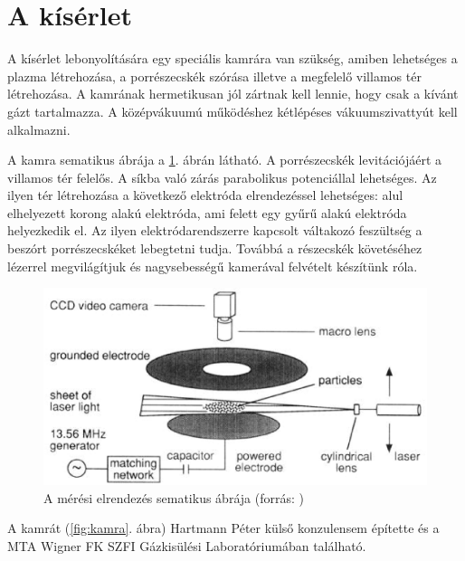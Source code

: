 \section{A kísérlet}
	A kísérlet lebonyolítására egy speciális kamrára van szükség, amiben lehetséges a plazma
	létrehozása, a porrészecskék szórása illetve a megfelelő villamos tér létrehozása.
	A kamrának hermetikusan jól zártnak kell lennie, hogy csak a kívánt gázt tartalmazza.
	A középvákuumú működéshez kétlépéses vákuumszivattyút kell alkalmazni.
	
	
	
	A kamra sematikus ábrája a \ref{fig:meresch}. ábrán látható.
	A porrészecskék levitációjáért a villamos tér felelős. A síkba való zárás parabolikus
	potenciállal lehetséges. Az ilyen tér létrehozása a következő elektróda elrendezéssel lehetséges:
	alul elhelyezett korong alakú elektróda, ami felett egy gyűrű alakú elektróda helyezkedik el.
	Az ilyen elektródarendszerre kapcsolt váltakozó feszültség a beszórt porrészecskéket lebegtetni
	tudja. Továbbá a részecskék követéséhez lézerrel megvilágítjuk és nagysebességű kamerával
	felvételt készítünk róla.
	
	\begin{figure}[H]
		\centering
		\includegraphics[width=0.9\columnwidth]{figures/eps/dust_camera.eps}
		\caption{A mérési elrendezés sematikus ábrája (forrás: \cite{Merlino2006})} 
		\label{fig:meresch}
	\end{figure}
	
	A kamrát (\ref{fig:kamra}. ábra) Hartmann Péter külső konzulensem építette és a MTA Wigner FK SZFI
	Gázkisülési Laboratóriumában található.
	
